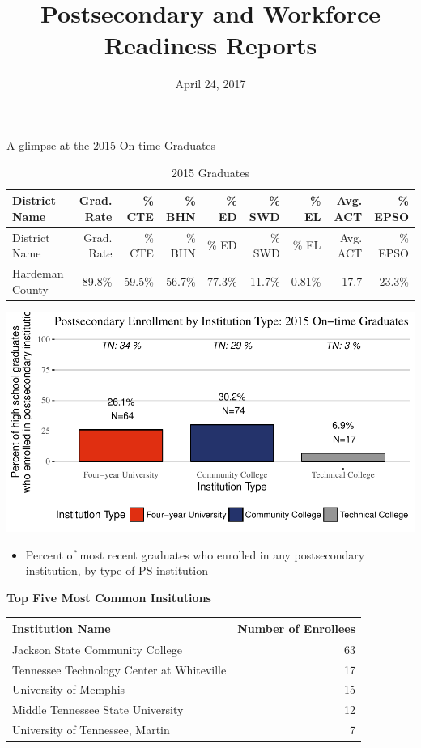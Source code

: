 \documentclass[11pt,]{article}
\title{Postsecondary and Workforce Readiness Reports}
\author{}
\date{April 24, 2017}
\providecommand{\tightlist}{%
  \setlength{\itemsep}{0pt}\setlength{\parskip}{0pt}}
\begin{document}
\maketitle

A glimpse at the 2015 On-time Graduates

\begin{longtable}[]{@{}lrrrrrrrr@{}}
\caption{2015 Graduates}\tabularnewline
\toprule
District Name & Grad. Rate & \% CTE & \% BHN & \% ED & \% SWD & \% EL &
Avg. ACT & \% EPSO\tabularnewline
\midrule
\endfirsthead
\toprule
District Name & Grad. Rate & \% CTE & \% BHN & \% ED & \% SWD & \% EL &
Avg. ACT & \% EPSO\tabularnewline
\midrule
\endhead
Hardeman County & 89.8\% & 59.5\% & 56.7\% & 77.3\% & 11.7\% & 0.81\% &
17.7 & 23.3\%\tabularnewline
\bottomrule
\end{longtable}

\begin{center}\includegraphics{20170424_PSWRR_files/figure-latex/`District by Type P1`-1} \end{center}

\begin{itemize}
\tightlist
\item
  Percent of most recent graduates who enrolled in any postsecondary
  institution, by type of PS institution 
\end{itemize}

\textbf{Top Five Most Common Insitutions}

\begin{longtable}[]{@{}lr@{}}
\toprule
Institution Name & Number of Enrollees\tabularnewline
\midrule
\endhead
Jackson State Community College & 63\tabularnewline
Tennessee Technology Center at Whiteville & 17\tabularnewline
University of Memphis & 15\tabularnewline
Middle Tennessee State University & 12\tabularnewline
University of Tennessee, Martin & 7\tabularnewline
\bottomrule
\end{longtable}
\end{document}
